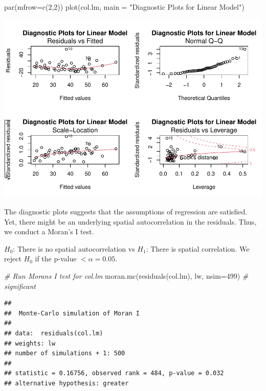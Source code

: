 \documentclass[
]{article}
\newenvironment{Shaded}{\begin{snugshade}}{\end{snugshade}}
\newcommand{\AttributeTok}[1]{\textcolor[rgb]{0.77,0.63,0.00}{#1}}
\newcommand{\CommentTok}[1]{\textcolor[rgb]{0.56,0.35,0.01}{\textit{#1}}}
\newcommand{\DecValTok}[1]{\textcolor[rgb]{0.00,0.00,0.81}{#1}}
\newcommand{\FunctionTok}[1]{\textcolor[rgb]{0.00,0.00,0.00}{#1}}
\newcommand{\NormalTok}[1]{#1}
\newcommand{\StringTok}[1]{\textcolor[rgb]{0.31,0.60,0.02}{#1}}
\begin{document}
\begin{Shaded}
\begin{Highlighting}[]
\FunctionTok{par}\NormalTok{(}\AttributeTok{mfrow=}\FunctionTok{c}\NormalTok{(}\DecValTok{2}\NormalTok{,}\DecValTok{2}\NormalTok{))}
\FunctionTok{plot}\NormalTok{(col.lm, }\AttributeTok{main =} \StringTok{"Diagnostic Plots for Linear Model"}\NormalTok{)}
\end{Highlighting}
\end{Shaded}

\includegraphics{midterm-project_files/figure-latex/unnamed-chunk-35-1.pdf}

The diagnostic plots suggests that the assumptions of regression are
satisfied. Yet, there might be an underlying spatial autocorrelation in
the residuals. Thus, we conduct a Moran's I test.

\(H_0\): There is no spatial autocorrelation vs \(H_1\): There is
spatial correlation. We reject \(H_0\) if the p-value
\(< \alpha = 0.05\).

\begin{Shaded}
\begin{Highlighting}[]
\CommentTok{\# Run Moran\textquotesingle{}s I test for col.lm}
\FunctionTok{moran.mc}\NormalTok{(}\FunctionTok{residuals}\NormalTok{(col.lm), lw, }\AttributeTok{nsim=}\DecValTok{499}\NormalTok{) }\CommentTok{\# significant}
\end{Highlighting}
\end{Shaded}

\begin{verbatim}
## 
##  Monte-Carlo simulation of Moran I
## 
## data:  residuals(col.lm) 
## weights: lw  
## number of simulations + 1: 500 
## 
## statistic = 0.16756, observed rank = 484, p-value = 0.032
## alternative hypothesis: greater
\end{verbatim}
\end{document}
